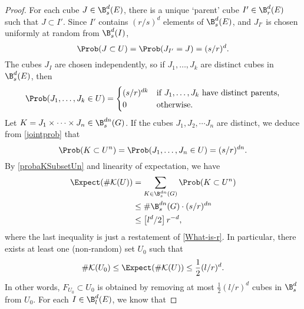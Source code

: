\begin{proof}
	For each cube $J \in \B_s^d(E)$, there is a unique `parent' cube $I' \in \B_r^d(E)$ such that $J \subset I'$. Since $I'$ contains $(r/s)^d$ elements of $\B^d_s(E)$, and $J_{I'}$ is chosen uniformly at random from $\B^d_s(I)$,
	\[ \Prob(J \subset U) = \Prob(J_{I'} = J) = (s/r)^d. \]
	The cubes $J_I$ are chosen independently, so if $J_1, \dots, J_k$ are distinct cubes in $\B^d_s(E)$, then %
	\begin{equation}\label{jointprob}
	\Prob(J_1, \dots, J_k \in U) = \begin{cases} (s/r)^{dk} & \text{if $J_1, \dots, J_k$ have distinct parents,} \\ 0 & \text{otherwise}. \end{cases} 
	\end{equation}
	Let $K = J_1 \times \dots \times J_n \in \B^{dn}_s(G)$. If the cubes $J_1, J_2, \cdots J_n$ are distinct, we deduce from \eqref{jointprob} that
	\begin{equation}\label{probaKSubsetUn}
		\Prob(K \subset U^n) = \Prob(J_1, \dots, J_n \in U) = (s/r)^{dn}.
	\end{equation}
	By \eqref{probaKSubsetUn} and linearity of expectation, we have 
	\begin{align*}
		\Expect(\# \mathcal{K}(U)) &= \sum_{K \in \B^{dn}_s(G)} \Prob(K \subset U^n) \\
		& \leq \# \B_s^{dn}(G) \cdot (s/r)^{dn} \\
		&\leq \left[ l^d/2 \right] r^{-d},
	\end{align*}
	where the last inequality is just a restatement of \eqref{What-is-r}. 
	In particular, there exists at least one (non-random) set $U_0$ such that
	\begin{equation}\label{KU0Small}
		\# \mathcal{K}(U_0) \leq \Expect(\# \mathcal{K}(U)) \leq \frac{1}{2}(l/r)^d.
	\end{equation}
	 In other words, $F_{U_0}\subset U_0$ is obtained by removing at most $\frac{1}{2}(l/r)^d$ cubes in $\B^d_s$ from $U_0$. For each $I \in \B_l^d(E)$, we know that 

\end{proof}
